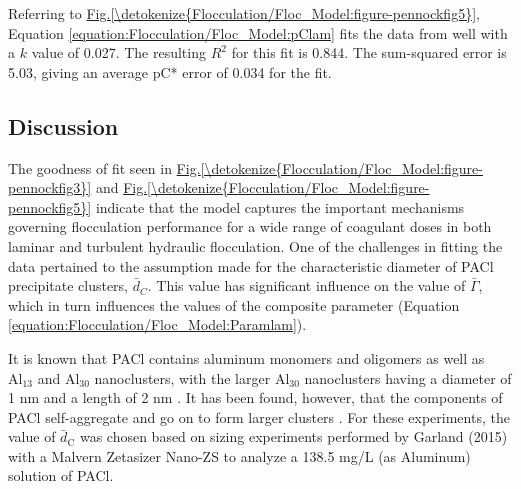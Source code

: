 \documentclass[letterpaper,10pt,english]{sphinxmanual}
\begin{document}
Referring to \hyperref[\detokenize{Flocculation/Floc_Model:figure-pennockfig5}]{Fig.\@ \ref{\detokenize{Flocculation/Floc_Model:figure-pennockfig5}}}, Equation \eqref{equation:Flocculation/Floc_Model:pClam} fits the data from \label{\detokenize{Flocculation/Floc_Model:id21}}{\hyperref[\detokenize{Flocculation/Floc_Model:floc-model-swetland-flocculation-sedimentation-2014}]{\sphinxcrossref{{[}SWSL14{]}}}} well with a \(k\) value of 0.027. The resulting \(R^2\) for this fit is 0.844. The sum-squared error is 5.03, giving an average pC* error of 0.034 for the fit.


\subsection{Discussion}
\label{\detokenize{Flocculation/Floc_Model:discussion}}
The goodness of fit seen in \hyperref[\detokenize{Flocculation/Floc_Model:figure-pennockfig3}]{Fig.\@ \ref{\detokenize{Flocculation/Floc_Model:figure-pennockfig3}}} and \hyperref[\detokenize{Flocculation/Floc_Model:figure-pennockfig5}]{Fig.\@ \ref{\detokenize{Flocculation/Floc_Model:figure-pennockfig5}}} indicate that the model captures the important mechanisms governing flocculation performance for a wide range of coagulant doses in both laminar and turbulent hydraulic flocculation. One of the challenges in fitting the data pertained to the assumption made for the characteristic diameter of PACl precipitate clusters, \(\bar{d}_C\). This value has significant influence on the value of \(\bar{\Gamma}\), which in turn influences the values of the composite parameter (Equation \eqref{equation:Flocculation/Floc_Model:Paramlam}).

It is known that PACl contains aluminum monomers and oligomers as well as \(\mathrm{Al_{13}}\) and \(\mathrm{Al_{30}}\) nanoclusters, with the larger \(\mathrm{Al_{30}}\) nanoclusters having a diameter of 1 nm and a length of 2 nm \label{\detokenize{Flocculation/Floc_Model:id22}}{\hyperref[\detokenize{Flocculation/Floc_Model:floc-model-mertens-polyaluminum-2012}]{\sphinxcrossref{{[}MCM+12{]}}}}. It has been found, however, that the components of PACl self-aggregate and go on to form larger clusters \label{\detokenize{Flocculation/Floc_Model:id23}}{\hyperref[\detokenize{Flocculation/Floc_Model:floc-model-swetland-influence-2013}]{\sphinxcrossref{{[}SWSL13{]}}}}. For these experiments, the value of \(\bar{d}_\mathrm{C}\) was chosen based on sizing experiments performed by Garland (2015) with a Malvern Zetasizer Nano-ZS to analyze a 138.5 mg/L (as Aluminum) solution of PACl.
\end{document}
